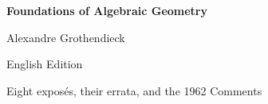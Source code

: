 \documentclass[11pt,twoside,openany]{book}
\begin{document}
\frontmatter
\begin{titlepage}
  \centering
  \vspace*{0.16\textheight}
  {\Huge\bfseries Foundations of Algebraic Geometry\par}
  \vspace{1.2\baselineskip}
  {\Large Alexandre Grothendieck\par}
  \vfill
  {\large English Edition\par}
  \vspace{0.5\baselineskip}
  {\normalsize Eight exposés, their errata, and the 1962 Comments\par}
\end{titlepage}

\tableofcontents
\mainmatter

















\end{document}
